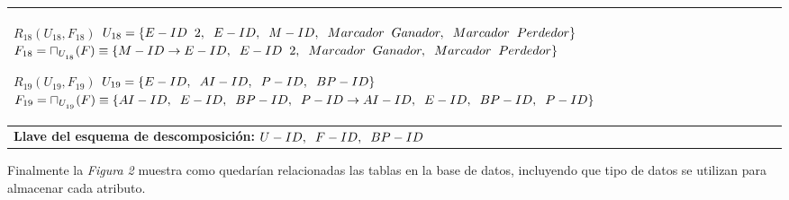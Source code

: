 \documentclass{report}
\begin{document}
\begin{tabularx}{\textwidth}{|X|}
        $ R_{18} ( U_{18} , F_{18} ) $ \newline 
        $ U_{18} = \{{E-ID \hspace{0.2cm} 2, \hspace{0.2cm}  E-ID, \hspace{0.2cm}  M-ID, \hspace{0.2cm}  Marcador \hspace{0.2cm} Ganador, \hspace{0.2cm}  Marcador \hspace{0.2cm} Perdedor}\} $ \newline 
        $ F_{18} = \sqcap_{U_{_{18}}}(F) \equiv \{M-ID \rightarrow E-ID, \hspace{0.2cm} E-ID \hspace{0.2cm} 2, \hspace{0.2cm} Marcador \hspace{0.2cm} Ganador, \hspace{0.2cm} Marcador \hspace{0.2cm} Perdedor \} $\newline 
        
        $ R_{19} ( U_{19} , F_{19} ) $ \newline 
        $ U_{19} = \{{E-ID, \hspace{0.2cm}  AI-ID, \hspace{0.2cm}  P-ID, \hspace{0.2cm}  BP-ID}\} $ \newline 
        $ F_{19} = \sqcap_{U_{_{19}}}(F) \equiv \{AI-ID, \hspace{0.2cm} E-ID, \hspace{0.2cm} BP-ID, \hspace{0.2cm} P-ID \rightarrow AI-ID, \hspace{0.2cm} E-ID, \hspace{0.2cm} BP-ID, \hspace{0.2cm} P-ID \} $\newline \\        
                
        \midrule
        \textbf{Llave del esquema de descomposición:} $U-ID, \hspace{0.2cm} F-ID, \hspace{0.2cm} BP-ID$  \\
        \bottomrule
    \end{tabularx}

    \vspace*{0.5cm}
    Finalmente la \textit{Figura 2} muestra como quedarían relacionadas las tablas en la base de datos, incluyendo que 
    tipo de datos se utilizan para almacenar cada atributo.\\
\end{document}
